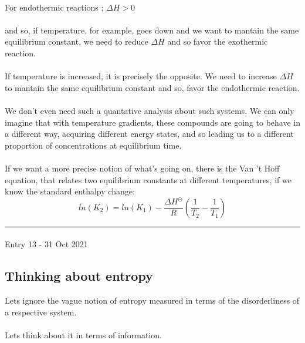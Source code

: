 \documentclass[12pt,  letterpaper]{article}
\begin{document}
\paragraph*{}
For endothermic reactions ; $\Delta H > 0$
\paragraph*{}
and so, if temperature, for example, goes down and we want to mantain the same equilibrium constant, we need to reduce $\Delta H$ and so favor the exothermic reaction.
\paragraph*{}
If temperature is increased, it is precisely the opposite. We need to increase $\Delta H$ to mantain the same equilibrium constant and so, favor the endothermic reaction.
\paragraph*{}
We don't even need such a quantative analysis about such systems. We can only imagine that with temperature gradients, these compounds are going to behave in a different way, acquiring different energy states, and so leading us to a different proportion of concentrations at equilibrium time.
\paragraph*{}
If we want a more precise notion of what's going on, there is the Van 't Hoff equation, that relates two equilibrium constants at different temperatures, if we know the standard enthalpy change:
\begin{equation}
ln(K_{2}) = ln(K_{1}) - \frac{\Delta H^{\ominus}}{R}\left(\frac{1}{T_{2}}-\frac{1}{T_{1}}\right)
\end{equation}
\hrule
\paragraph*{}
Entry 13 - 31 Oct 2021
\subsection*{Thinking about entropy}
Lets ignore the vague notion of entropy measured in terms of the disorderliness of a respective system.
\paragraph*{}
Lets think about it in terms of information.
\end{document}
